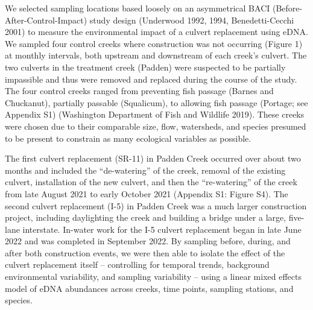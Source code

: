 \documentclass[
]{article}
\begin{document}
We selected sampling locations based loosely on an asymmetrical BACI
(Before-After-Control-Impact) study design (Underwood 1992, 1994,
Benedetti-Cecchi 2001) to measure the environmental impact of a culvert
replacement using eDNA. We sampled four control creeks where
construction was not occurring (Figure 1) at monthly intervals, both
upstream and downstream of each creek's culvert. The two culverts in the
treatment creek (Padden) were suspected to be partially impassible and
thus were removed and replaced during the course of the study. The four
control creeks ranged from preventing fish passage (Barnes and
Chuckanut), partially passable (Squalicum), to allowing fish passage
(Portage; see Appendix S1) (Washington Department of Fish and Wildlife
2019). These creeks were chosen due to their comparable size, flow,
watersheds, and species presumed to be present to constrain as many
ecological variables as possible.

The first culvert replacement (SR-11) in Padden Creek occurred over
about two months and included the ``de-watering'' of the creek, removal
of the existing culvert, installation of the new culvert, and then the
``re-watering'' of the creek from late August 2021 to early October 2021
(Appendix S1: Figure S4). The second culvert replacement (I-5) in Padden
Creek was a much larger construction project, including daylighting the
creek and building a bridge under a large, five-lane interstate.
In-water work for the I-5 culvert replacement began in late June 2022
and was completed in September 2022. By sampling before, during, and
after both construction events, we were then able to isolate the effect
of the culvert replacement itself -- controlling for temporal trends,
background environmental variability, and sampling variability -- using
a linear mixed effects model of eDNA abundances across creeks, time
points, sampling stations, and species.
\end{document}
